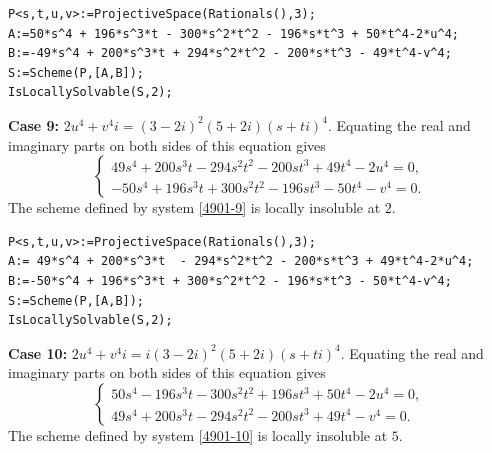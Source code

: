 \documentclass[a4paper,12pt,english,reqno]{amsart}
\begin{document}

\begin{lstlisting}
P<s,t,u,v>:=ProjectiveSpace(Rationals(),3);
A:=50*s^4 + 196*s^3*t - 300*s^2*t^2 - 196*s*t^3 + 50*t^4-2*u^4;
B:=-49*s^4 + 200*s^3*t + 294*s^2*t^2 - 200*s*t^3 - 49*t^4-v^4;
S:=Scheme(P,[A,B]);
IsLocallySolvable(S,2);
\end{lstlisting}



{\bf Case 9:} $2u^4+v^4i=(3- 2i)^2(5+2i)(s+ti)^4$.  Equating the real and imaginary parts on both sides of this equation gives
\begin{equation}\label{4901-9}
\begin{cases}
49s^4 + 200s^3t - 294s^2t^2 - 200st^3 + 49t^4 - 2u^4=0,\\
-50s^4 + 196s^3t + 300s^2t^2 - 196st^3 - 50t^4 - v^4=0.
\end{cases}
\end{equation}
The scheme defined by system \eqref{4901-9} is locally insoluble at $2$.

\begin{lstlisting}
P<s,t,u,v>:=ProjectiveSpace(Rationals(),3);
A:= 49*s^4 + 200*s^3*t  - 294*s^2*t^2 - 200*s*t^3 + 49*t^4-2*u^4;
B:=-50*s^4 + 196*s^3*t + 300*s^2*t^2 - 196*s*t^3 - 50*t^4-v^4;
S:=Scheme(P,[A,B]);
IsLocallySolvable(S,2);
\end{lstlisting}


{\bf Case 10:} $2u^4+v^4i=i(3- 2i)^2(5+2i)(s+ti)^4$.  Equating the real and imaginary parts on both sides of this equation gives
\begin{equation}\label{4901-10}
\begin{cases}
50s^4 - 196s^3t - 300s^2t^2 + 196st^3 + 50t^4 - 2u^4=0,\\
49s^4 + 200s^3t - 294s^2t^2 - 200st^3 + 49t^4 - v^4=0.
\end{cases}
\end{equation}
The scheme defined by system \eqref{4901-10} is locally insoluble at $5$.
\end{document}
